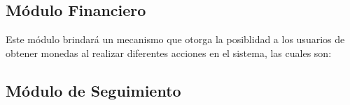   

\subsection*{Módulo Financiero}

Este módulo brindará un mecanismo que otorga la posiblidad a los usuarios de 
obtener monedas al realizar diferentes acciones en el sistema, las cuales son:





\subsection*{Módulo de Seguimiento}

